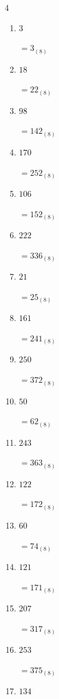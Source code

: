 \begin{multicols}{4}
\begin{enumerate}
  \item $3$

        $=3_{(8)}$

  \item $18$

        $=22_{(8)}$

  \item $98$

        $=142_{(8)}$

  \item $170$

        $=252_{(8)}$

  \item $106$

        $=152_{(8)}$

  \item $222$

        $=336_{(8)}$

  \item $21$

        $=25_{(8)}$

  \item $161$

        $=241_{(8)}$

  \item $250$

        $=372_{(8)}$

  \item $50$

        $=62_{(8)}$

  \item $243$

        $=363_{(8)}$

\columnbreak %

  \item $122$

        $=172_{(8)}$

  \item $60$

        $=74_{(8)}$

  \item $121$

        $=171_{(8)}$

  \item $207$

        $=317_{(8)}$

  \item $253$

        $=375_{(8)}$

  \item $134$


\end{enumerate}
\end{multicols}
